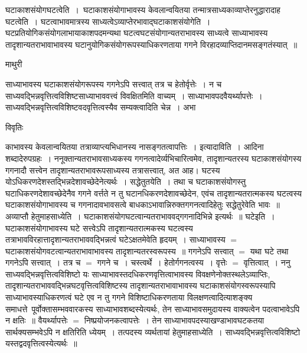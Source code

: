 \documentclass[10pt, openany]{book}
\begin{document}
{{\qt घटाकाशसंयोगघटत्वेति}~।~घटाकाशसंयोगाभावस्य केवलान्वयितया तन्मात्रसाध्यकाव्याप्तेरनुद्धारादाह \textendash  घटत्वेति~। घटत्वाभावमात्रस्य
साध्यत्वेऽव्याप्तेरभावाद्घटाकाश{\qt संयोगेति~।} घटप्रतियोगिकसंयोगलाभायाकाशपदमन्यथा घटत्वघटसंयोगान्यतराभावस्य साध्यत्वे साध्याभावस्य तादृशान्यतराभावाभावस्य घटानुयोगिकसंयोगरूपस्याधिकरणताया गगने विरहादव्याप्तिदानमसङ्गतंस्यात्~॥~
\newpage
\begin{center}  माथुरी  \end{center} 
{\la साध्याभावस्य घटाकाशसंयोगरूपस्य गगनेऽपि सत्त्वात् तत्र च 
हेतोर्वृत्तेः~। न च साध्यवद्भिन्नवृत्तित्वविशिष्टसाध्याभाववत्त्वं विवक्षितमिति वाच्यम्~। साध्याभावपदवैयर्थ्यापत्तेः~। साध्यवद्भिन्नवृत्तित्वविशिष्टवदवृत्तित्वस्यैव सम्यक्त्वादिति चेन्न~। अभा}
\begin{center}     विवृतिः \end{center}
काभावस्य केवलान्वयितया तत्राव्याप्त्यभिधानस्य नासङ्गतत्वापत्तिः~। इत्यादाविति~। आदिना शब्दादेरुपग्रहः~। ननूक्तान्यतराभावसाध्यकस्य गगनत्वादेर्व्यभिचारित्वमेव, तादृशान्यतरस्य घटाकाशसंयोगस्य गगनादौ सत्त्वेन तादृशान्यतराभावरूपसाध्यस्य तत्रासत्त्वात्, अत आह। घटस्य योऽधिकरणदेशस्तद्भिन्नदेशावच्छेदेनेत्यर्थः~। {\qt सद्धेतुतयेति}~। तथा च घटाकाशसंयोगस्तु घटाधिकरणदेशावच्छेदेनैव गगने वर्त्तते न तु घटानधिकरणदेशावच्छेदेन,
एवंच तादृशान्यतरात्मकस्य घटत्वस्य घटाकाशसंयोगाभावस्य च गगनादावभावसत्वे बाधकाऽभावान्निरुक्तगगनत्वादिहेतुः सद्धेतुरेवेति भावः~॥ अव्याप्तौ
हेतुमाह{\la साध्येति~।} {\qt घटाकाशसंयोगघटत्वान्यतराभाववद्गगनादिभिन्ने }इत्यर्थः~॥ घटेइति~। घटाकाशसंयोगाभावस्य घटे सत्त्वेऽपि तादृशान्यतरात्मकस्य घटत्वस्य तत्राभावविरहात्तादृशान्यतराभाववद्भिन्नत्वं घटेऽक्षतमेवेति हृदयम्~। साध्याभावस्य $=$ घटाकाशसंयोगवटत्वान्यतराभावाभावस्य तादृशान्यतरस्वरूपस्य~॥ गगनेऽपि सत्त्वात् $=$ यथा घटे तथा गगनेऽपि सत्त्वात्~। तत्र च $=$ गगने च~। चस्त्वर्थे~। हेतोर्गगनत्वस्य~। वृत्तेः $=$ वृत्तित्वात्~। ननु
साध्यवद्भिन्नवृत्तित्वविशिष्टो यः साध्याभावस्तदधिकरणवृत्तित्वाभावस्य विवक्षणेनोक्तस्थलेऽव्याप्तिः, तादृशान्यतराभाववद्भिन्नघटवृत्तित्वविशिष्टस्य तादृशान्यतराभावाभावस्य घटाकाशसंयोगस्वरूपस्यापि साध्याभावस्याधिकरणत्वं घटे एव न तु गगने विशिष्टाधिकरणताया विलक्षणत्वादित्याशङ्क्य समाधत्ते~पूर्वोक्तासम्भववारकस्य साध्याभावशब्दस्येत्यर्थः, तेन साध्याभावसमुदायस्य वाक्यत्वेन पदत्वाभावेऽपि न क्षतिः~॥ वैयर्थ्यापत्तेः $=$ निष्प्रयोजनकत्वापत्तेः~। तेन
साध्याभावपदस्याखण्डाभावघटकतया सार्थक्यसम्भवेऽपि न क्षतिरिति ध्येयम्~। तत्पदस्य व्यर्थतायां हेतुमाह{\la साध्येति~।} साध्यवद्भिन्नवृत्तित्वविशिष्टो यस्तद्वदवृत्तित्वस्येत्यर्थः~॥\\

}
\end{document}
